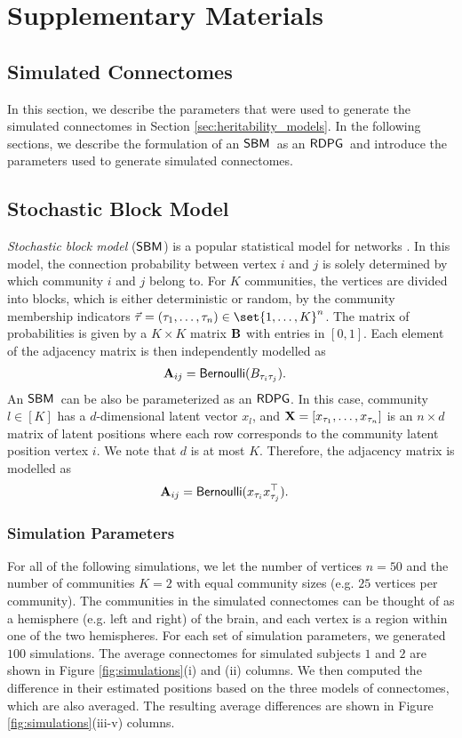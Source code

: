 \section{Supplementary Materials}
\subsection{Simulated Connectomes}\label{sup:simulations}
In this section, we describe the parameters that were used to generate the simulated connectomes in Section \ref{sec:heritability_models}. In the following sections, we describe the formulation of an $\operatorname{\mathsf{SBM}}$~as an $\operatorname{\mathsf{RDPG}}$~and introduce the parameters used to generate simulated connectomes. 

\subsection{Stochastic Block Model} \label{sec:sbm}
\textit{Stochastic block model }($\operatorname{\mathsf{SBM}}$) is a popular statistical model for networks \cite{holland1983stochastic}. In this model, the connection probability between vertex $i$ and $j$ is solely determined by which community $i$ and $j$ belong to. For $K$ communities, the vertices are divided into blocks, which is either deterministic or random, by the community membership indicators $\vec\tau = (\tau_1, \ldots, \tau_n)\in \set{1, \ldots, K}^n$. The matrix of probabilities is given by a $K\times K$ matrix $\operatorname*{\mathbf{B}}$ with entries in $[0, 1]$. Each element of the adjacency matrix is then independently modelled as
\begin{align*}
    \operatorname{\mathbf{A}}_{ij} &= \operatorname{\mathsf{Bernoulli}}(B_{\tau_i\tau_j}).
\end{align*}
An $\operatorname{\mathsf{SBM}}$\ can be also be parameterized as an $\operatorname{\mathsf{RDPG}}$. In this case, community $l\in [K]$ has a $d$-dimensional latent vector $x_l$, and $\operatorname{\mathbf{X}}=[x_{\tau_1}, \ldots, x_{\tau_n}]$ is an $n \times d$ matrix of latent positions where each row corresponds to the community latent position vertex $i$. We note that $d$ is at most $K$. Therefore, the adjacency matrix is modelled as
\begin{align*}
    \operatorname{\mathbf{A}}_{ij} &= \operatorname{\mathsf{Bernoulli}}(x_{\tau_i} x_{\tau_j}^\top).
\end{align*}

\subsubsection{Simulation Parameters}
For all of the following simulations, we let the number of vertices $n=50$ and the number of communities $K=2$ with equal community sizes (e.g. $25$ vertices per community). The communities in the simulated connectomes can be thought of as a hemisphere (e.g. left and right) of the brain, and each vertex is a region within one of the two hemispheres. For each set of simulation parameters, we generated $100$ simulations. The average connectomes for simulated subjects $1$ and $2$ are shown in Figure \ref{fig:simulations}(i) and (ii) columns. We then computed the difference in their estimated positions based on the three models of connectomes, which are also averaged. The resulting average differences are shown in Figure \ref{fig:simulations}(iii-v) columns.  

